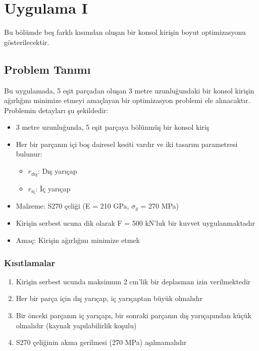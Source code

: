 \section{Uygulama I}
Bu bölümde beş farklı kısımdan oluşan bir konsol kirişin boyut optimizasyonu gösterilecektir.


\subsection{Problem Tanımı}
Bu uygulamada, 5 eşit parçadan oluşan 3 metre uzunluğundaki bir konsol kirişin ağırlığını minimize etmeyi amaçlayan bir optimizasyon problemi ele alınacaktır. Problemin detayları şu şekildedir:

\begin{itemize}
    \item 3 metre uzunluğunda, 5 eşit parçaya bölünmüş bir konsol kiriş
    \item Her bir parçanın içi boş dairesel kesiti vardır ve iki tasarım parametresi bulunur:
    \begin{itemize}
        \item $r_{dış}$: Dış yarıçap
        \item $r_{iç}$: İç yarıçap
    \end{itemize}
    \item Malzeme: S270 çeliği (E = 210 GPa, $\sigma_y$ = 270 MPa)
    \item Kirişin serbest ucuna dik olarak F = 500 kN'luk bir kuvvet uygulanmaktadır
    \item Amaç: Kirişin ağırlığını minimize etmek
\end{itemize}

\subsubsection{Kısıtlamalar}
\begin{enumerate}
    \item Kirişin serbest ucunda maksimum 2 cm'lik bir deplasman izin verilmektedir
    \item Her bir parça için dış yarıçap, iç yarıçaptan büyük olmalıdır
    \item Bir önceki parçanın iç yarıçapı, bir sonraki parçanın dış yarıçapından küçük olmalıdır (kaynak yapılabilirlik koşulu)
    \item S270 çeliğinin akma gerilmesi (270 MPa) aşılmamalıdır
\end{enumerate}

